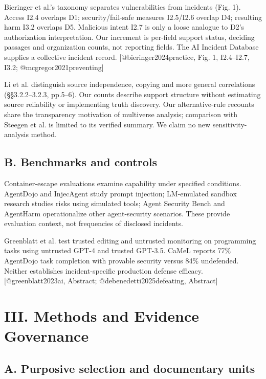 \documentclass[conference]{IEEEtran}
\providecommand{\citep}[1]{\cite{#1}}
\begin{document}
Bieringer et al.'s taxonomy separates vulnerabilities from incidents (Fig. 1). Access I2.4 overlaps D1; security/fail-safe measures I2.5/I2.6 overlap D4; resulting harm I3.2 overlaps D5. Malicious intent I2.7 is only a loose analogue to D2's authorization interpretation. Our increment is per-field support status, deciding passages and organization counts, not reporting fields. The AI Incident Database supplies a collective incident record. [@bieringer2024practice, Fig. 1, I2.4--I2.7, I3.2; @mcgregor2021preventing]

Li et al. distinguish source independence, copying and more general correlations (§§3.2.2--3.2.3, pp.5--6). Our counts describe support structure without estimating source reliability or implementing truth discovery. \citep{li2016survey} Our alternative-rule recounts share the transparency motivation of multiverse analysis; comparison with Steegen et al. is limited to its verified summary. We claim no new sensitivity-analysis method. \citep{steegen2016increasing}

\subsection{B. Benchmarks and controls}

Container-escape evaluations examine capability under specified conditions. AgentDojo and InjecAgent study prompt injection; LM-emulated sandbox research studies risks using simulated tools; Agent Security Bench and AgentHarm operationalize other agent-security scenarios. These provide evaluation context, not frequencies of disclosed incidents. \citep{marchand2026quantifying,debenedetti2024agentdojo,zhan2024injecagent,ruan2023identifying,zhang2024agent,andriushchenko2024agentharm}

Greenblatt et al. test trusted editing and untrusted monitoring on programming tasks using untrusted GPT-4 and trusted GPT-3.5. CaMeL reports 77\% AgentDojo task completion with provable security versus 84\% undefended. Neither establishes incident-specific production defense efficacy. [@greenblatt2023ai, Abstract; @debenedetti2025defeating, Abstract]

\section{III. Methods and Evidence Governance}

\subsection{A. Purposive selection and documentary units}
\end{document}
